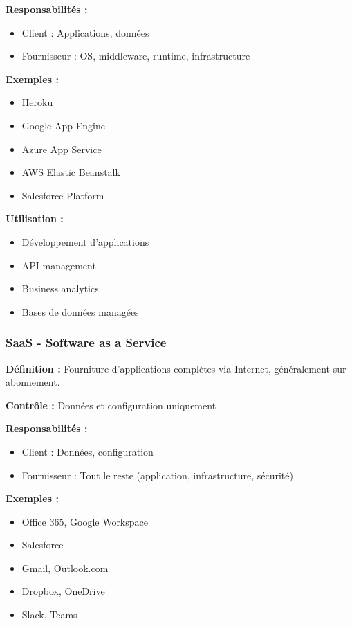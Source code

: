 \documentclass[11pt,a4paper]{article}
\begin{document}
\textbf{Responsabilités :}
\begin{itemize}
    \item Client : Applications, données
    \item Fournisseur : OS, middleware, runtime, infrastructure
\end{itemize}

\textbf{Exemples :}
\begin{itemize}
    \item Heroku
    \item Google App Engine
    \item Azure App Service
    \item AWS Elastic Beanstalk
    \item Salesforce Platform
\end{itemize}

\textbf{Utilisation :}
\begin{itemize}
    \item Développement d'applications
    \item API management
    \item Business analytics
    \item Bases de données managées
\end{itemize}

\subsubsection{SaaS - Software as a Service}

\textbf{Définition :} Fourniture d'applications complètes via Internet, généralement sur abonnement.

\textbf{Contrôle :} Données et configuration uniquement

\textbf{Responsabilités :}
\begin{itemize}
    \item Client : Données, configuration
    \item Fournisseur : Tout le reste (application, infrastructure, sécurité)
\end{itemize}

\textbf{Exemples :}
\begin{itemize}
    \item Office 365, Google Workspace
    \item Salesforce
    \item Gmail, Outlook.com
    \item Dropbox, OneDrive
    \item Slack, Teams
\end{itemize}
\end{document}
